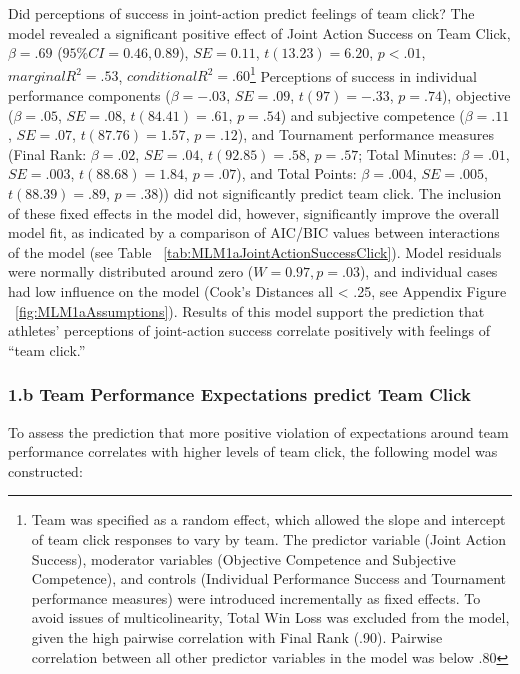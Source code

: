 Did perceptions of success in joint-action predict feelings of team click?  The model revealed a significant positive effect of Joint Action Success on Team Click, $\beta = .69$ ($95\% CI =  0.46, 0.89$), $SE = 0.11$, $t(13.23) = 6.20$, $p < .01$, $marginal R^2 = .53$, $conditional R^2 = .60$\footnote{Team was specified as a random effect, which allowed the slope and intercept of team click responses to vary by team. The predictor variable (Joint Action Success), moderator variables (Objective Competence and Subjective Competence), and controls (Individual Performance Success and Tournament performance measures) were introduced incrementally as fixed effects. To avoid issues of multicolinearity, Total Win Loss was excluded from the model, given the high pairwise correlation with Final Rank (.90). Pairwise correlation between all other predictor variables in the model was below .80}  Perceptions of success in individual performance components ($\beta = -.03$, $SE = .09$, $t(97) = -.33$, $p = .74$), objective ($\beta = .05$, $SE = .08$, $t(84.41) = .61$, $p = .54$) and subjective competence ($\beta = .11$, $SE = .07$, $t(87.76) = 1.57$, $p = .12$), and Tournament performance measures (Final Rank: $\beta = .02$, $SE = .04$, $t(92.85) = .58$, $p = .57$; Total Minutes: $\beta = .01$, $SE = .003$, $t(88.68) = 1.84$, $p = .07$), and Total Points: $\beta = .004$, $SE = .005$, $t(88.39) = .89$, $p = .38$)) did not significantly predict team click.  The inclusion of these fixed effects in the model did, however, significantly improve the overall model fit, as indicated by a comparison of AIC/BIC values between interactions of the model (see Table ~\ref{tab:MLM1aJointActionSuccessClick}).  Model residuals were normally distributed around zero ($W = 0.97, p = .03$), and individual cases had low influence on the model (Cook's Distances all < .25, see Appendix Figure ~\ref{fig:MLM1aAssumptions}). Results of this model support the prediction that athletes' perceptions of joint-action success correlate positively with feelings of ``team click.''






\subsubsection{1.b Team Performance Expectations predict Team Click}

To assess the prediction that more positive violation of expectations around team performance correlates with higher levels of team click, the following model was constructed:

